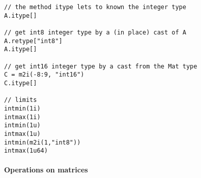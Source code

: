 \begin{mandescription}
\begin{Verbatim}
// the method itype lets to known the integer type
A.itype[]

// get int8 integer type by a (in place) cast of A
A.retype["int8"]
A.itype[]

// get int16 integer type by a cast from the Mat type
C = m2i(-8:9, "int16")
C.itype[]

// limits
intmin(1i)
intmax(1i)
intmin(1u)
intmax(1u)
intmin(m2i(1,"int8"))
intmax(1u64)
\end{Verbatim}


\end{mandescription}

\paragraph{Operations on matrices}


